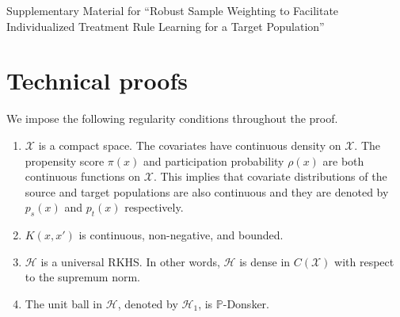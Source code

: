 \documentclass[12pt]{article}
\newcommand{\prob}{\mathbb{P}}
\begin{document}



\newpage 

\appendix 

\renewcommand{\thesection}{S\arabic{section}}
\renewcommand{\thefigure}{S\arabic{figure}}
\renewcommand{\thetable}{S\arabic{table}}
\renewcommand{\theequation}{S\arabic{equation}}
\setcounter{figure}{0}

{\large Supplementary Material for ``Robust Sample Weighting to Facilitate Individualized Treatment Rule Learning for a Target Population''}

\section{Technical proofs}

We impose the following regularity conditions throughout the proof.
\begin{enumerate}[label = (\alph*), itemsep=0pt]
	\item $\mathcal{X}$ is a compact space. The covariates have continuous density on $\mathcal{X}$. The propensity score $\pi(x)$ and participation probability $\rho(x)$ are both continuous functions on $\mathcal{X}$. This implies that covariate distributions of the source and target populations are also continuous and they are denoted by $p_s(x)$ and $p_t(x)$ respectively.
	\item $K(x, x')$ is continuous, non-negative, and bounded.
	\item $\mathcal{H}$ is a universal RKHS. In other words, $\mathcal{H}$ is dense in $C(\mathcal{X})$ with respect to the supremum norm. 
	\item The unit ball in $\mathcal{H}$, denoted by $\mathcal{H}_1$, is $\prob$-Donsker.

\end{enumerate}
\end{document}
